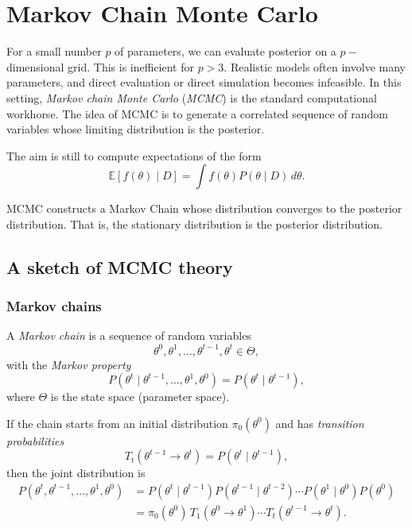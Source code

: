 \documentclass[11pt, titlepage]{article} %
\numberwithin{equation}{section}
\theoremstyle{definition}
\numberwithin{assumption}{section}
\begin{document}
\section{Markov Chain Monte Carlo}

For a small number $p$ of parameters, we can evaluate posterior on a $p-$dimensional grid. This is inefficient for $p>3$. Realistic models often involve many parameters, and direct evaluation or direct simulation becomes infeasible. In this setting, \textit{Markov chain Monte Carlo} (\textit{MCMC}) is the standard computational workhorse. The idea of MCMC is to generate a correlated sequence of random variables whose limiting distribution is the posterior.

The aim is still to compute expectations of the form
\begin{equation*}
    \mathbb{E}[f(\theta)\mid D]=\int f(\theta)P(\theta\mid D)\,d\theta.
\end{equation*}

MCMC constructs a Markov Chain whose distribution converges to the posterior distribution. That is, the stationary distribution is the posterior distribution.

\subsection{A sketch of MCMC theory}

\subsubsection*{Markov chains}

A \textit{Markov chain} is a sequence of random variables
\begin{equation*}
    \theta^0,\theta^1,\dots,\theta^{t-1},\theta^t \in \Theta,
\end{equation*}
with the \textit{Markov property}
\begin{equation*}
    P(\theta^t \mid \theta^{t-1},\dots,\theta^1,\theta^0)
    =
    P(\theta^t \mid \theta^{t-1}),
\end{equation*}
where $\Theta$ is the state space (parameter space).

If the chain starts from an initial distribution $\pi_0(\theta^0)$ and has \textit{transition probabilities}
\begin{equation*}
    T_t(\theta^{t-1}\to \theta^t)
    =
    P(\theta^t\mid \theta^{t-1}),
\end{equation*}
then the joint distribution is
\begin{align*}
    P(\theta^t,\theta^{t-1},\dots,\theta^1,\theta^0)
    &=
    P(\theta^t\mid \theta^{t-1})P(\theta^{t-1}\mid \theta^{t-2})\cdots P(\theta^1\mid \theta^0)P(\theta^0)\\
    &=
    \pi_0(\theta^0)\,T_1(\theta^0\to \theta^1)\cdots T_t(\theta^{t-1}\to \theta^t).
\end{align*}
\end{document}
